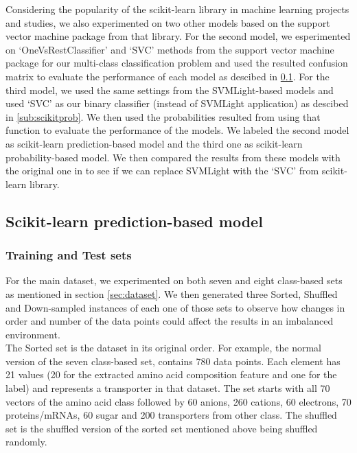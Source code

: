     Considering the popularity of the scikit-learn library in machine learning projects and studies, we also experimented on two 
    other models based on the support vector machine package from that library. For the second model, we esperimented 
    on `OneVsRestClassifier' and `SVC' methods from the support vector machine package for our multi-class classification problem
    and used the resulted confusion matrix to evaluate the performance of each model as descibed in \ref{sub:scikitpred}. 
    For the third model, we used the same settings from the SVMLight-based models and used `SVC' 
    as our binary classifier (instead of SVMLight application) as descibed in \ref{sub:scikitprob}. 
    We then used the probabilities resulted from using that function to evaluate the performance of the models. 
    We labeled the second model as scikit-learn prediction-based model and 
    the third one as scikit-learn probability-based model. We then compared the results from these models with the 
    original one in \cite{mishra2014prediction} to see if we can replace SVMLight with the `SVC' from scikit-learn library. 
    

    \subsection{Scikit-learn prediction-based model}
    \label{sub:scikitpred}

    \subsubsection{Training and Test sets}
    \label{subsub:scikittraintest}
    For the main dataset, we experimented on both seven and eight class-based sets as mentioned in section \ref{sec:dataset}.
    We then generated three Sorted, Shuffled and Down-sampled instances of each one of those sets
    to observe how changes in order and number of the data points could affect the results in an imbalanced environment.\\
    
    The Sorted set is the dataset in its original order. For example, the normal version of the seven class-based set, 
    contains 780 data points. Each element has 21 values (20 for the extracted amino acid composition feature and one for the label) 
    and represents a transporter in that dataset. The set starts with all 70 vectors of the amino acid class 
    followed by 60 anions, 260 cations, 60 electrons, 70 proteins/mRNAs, 60 sugar and 200 transporters from other class. 
    The shuffled set is the shuffled version of the sorted set mentioned above being shuffled randomly.\\

